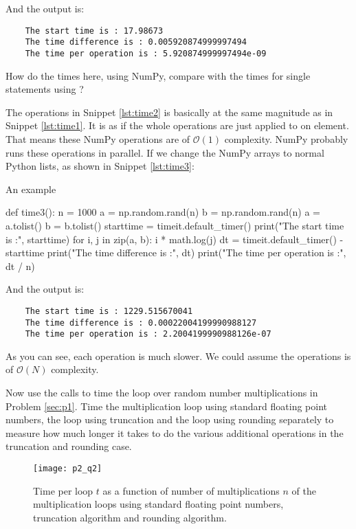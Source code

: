 And the output is:

\begin{verbatim}
    The start time is : 17.98673
    The time difference is : 0.005920874999997494
    The time per operation is : 5.920874999997494e-09
\end{verbatim}

\Question How do the times here, using NumPy, compare with the times for single
statements using ?

\Answer The operations in Snippet \ref{lst:time2} is basically at the same magnitude as
in Snippet \ref{lst:time1}. It is as if the whole operations are just applied to
on element. That means these NumPy operations are of $\mathcal{O}(1)$ complexity.
NumPy probably runs these operations in parallel.
If we change the NumPy arrays to normal Python lists, as shown in Snippet \ref{lst:time3}:

\begin{algorithm}[H]
    \caption{An example}
    \label{lst:time3}
    \begin{pythoncode}
        def time3():
            n = 1000
            a = np.random.rand(n)
            b = np.random.rand(n)
            a = a.tolist()
            b = b.tolist()
            starttime = timeit.default_timer()
            print("The start time is :", starttime)
            for i, j in zip(a, b):
                i * math.log(j)
            dt = timeit.default_timer() - starttime
            print("The time difference is :", dt)
            print("The time per operation is :", dt / n)
        \end{pythoncode}
\end{algorithm}

And the output is:

\begin{verbatim}
    The start time is : 1229.515670041
    The time difference is : 0.00022004199990988127
    The time per operation is : 2.2004199990988126e-07
\end{verbatim}

As you can see, each operation is much slower. We could assume the operations is
of $\mathcal{O}(N)$ complexity.

\Question Now use the  calls to time the loop over random number
multiplications in Problem \ref{sec:p1}. Time the multiplication loop using standard
floating point numbers, the loop using truncation and the loop using rounding separately to
measure how much longer it takes to do the various additional operations in the truncation
and rounding case.

\Answer

\begin{figure}[H]
    \centering
    \texttt{[image: p2\_q2]}
    \caption{Time per loop $t$ as a function of number of multiplications $n$ of
        the multiplication loops using standard floating point numbers,
        truncation algorithm and rounding algorithm.}
    \label{fig:time_loop}
\end{figure}
